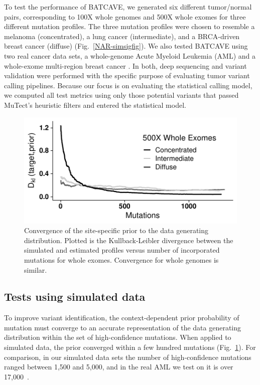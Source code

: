 \documentclass[a4,center,fleqn]{NAR}
\newcommand{\batcave}{BATCAVE\xspace}
\begin{document}
To test the performance of \batcave, we generated six different tumor/normal pairs, corresponding to 100X whole genomes and 500X whole exomes for three different mutation profiles.
The three mutation profiles were chosen to resemble a melanoma (concentrated), a lung cancer (intermediate), and a BRCA-driven breast cancer (diffuse) (Fig.~\ref{NAR-simsigfig}).
We also tested \batcave using two real cancer data sets, a whole-genome Acute Myeloid Leukemia (AML) \citep{Griffith2015} and a whole-exome multi-region breast cancer \cite{Shi2018}.
In both, deep sequencing and variant validation were performed with the specific purpose of evaluating tumor variant calling pipelines.
Because our focus is on evaluating the statistical calling model, we computed all test metrics using only those potential variants that passed MuTect's heuristic filters and entered the statistical model.

\begin{figure}
  \begin{center}
  \includegraphics{figures/kl_only.pdf}
  \end{center}
  \caption{Convergence of the site-specific prior to the data generating distribution. Plotted is the Kullback-Leibler divergence between the simulated and estimated profiles versus number of incorporated mutations for whole exomes. Convergence for whole genomes is similar.
  }
\label{NAR-kl_fig}
\end{figure}

\subsection{Tests using simulated data}

To improve variant identification, the context-dependent prior probability of mutation must converge to an accurate representation of the data generating distribution within the set of high-confidence mutations.
When applied to simulated data, the prior converged within a few hundred mutations (Fig.~\ref{NAR-kl_fig}).
For comparison, in our simulated data sets the number of high-confidence mutations ranged between 1,500 and 5,000, and in the real AML we test on it is over 17,000~\cite{Griffith2015}.
\end{document}
